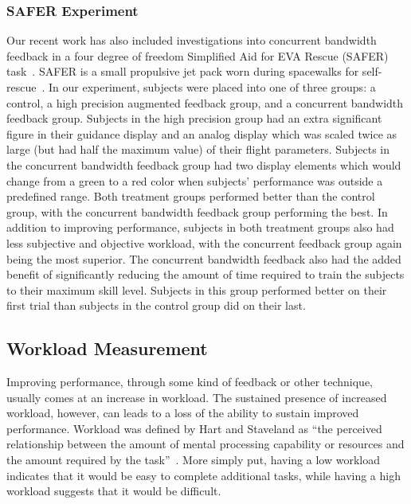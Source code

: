 \documentclass[float=false, crop=false]{standalone}
\begin{document}
\subsubsection{SAFER Experiment}
Our recent work has also included investigations into concurrent bandwidth feedback in a four degree of freedom Simplified Aid for EVA Rescue (SAFER) task~\cite{Karasinski2017}.
SAFER is a small propulsive jet pack worn during spacewalks for self-rescue~\cite{Vassigh1998}.
In our experiment, subjects were placed into one of three groups: a control, a high precision augmented feedback group, and a concurrent bandwidth feedback group.
Subjects in the high precision group had an extra significant figure in their guidance display and an analog display which was scaled twice as large (but had half the maximum value) of their flight parameters.
Subjects in the concurrent bandwidth feedback group had two display elements which would change from a green to a red color when subjects' performance was outside a predefined range.
Both treatment groups performed better than the control group, with the concurrent bandwidth feedback group performing the best.
In addition to improving performance, subjects in both treatment groups also had less subjective and objective workload, with the concurrent feedback group again being the most superior.
The concurrent bandwidth feedback also had the added benefit of significantly reducing the amount of time required to train the subjects to their maximum skill level.
Subjects in this group performed better on their first trial than subjects in the control group did on their last.

\subsection{Workload Measurement}
Improving performance, through some kind of feedback or other technique, usually comes at an increase in workload.
The sustained presence of increased workload, however, can leads to a loss of the ability to sustain improved performance.
Workload was defined by Hart and Staveland as ``the perceived relationship between the amount of mental processing capability or resources and the amount required by the task''~\cite{Hart1988}.
More simply put, having a low workload indicates that it would be easy to complete additional tasks, while having a high workload suggests that it would be difficult.
\end{document}
